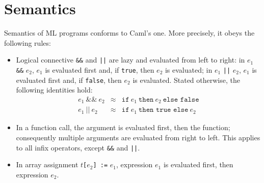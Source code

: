 \documentclass[a4paper,12pt]{report}
\newcommand{\caml}{\textsf{Caml}}
\newcommand{\te}[1]{\texttt{#1}}
\begin{document}
\section{Semantics}
\label{semantics}

Semantics of ML programs conforms to \caml's one.
More precisely, it obeys the following rules:
\begin{itemize}
\item 
  Logical connective \texttt{\&\&} and \texttt{||} are lazy and
  evaluated from left to right: in $e_1$ \texttt{\&\&} $e_2$, $e_1$ is
  evaluated first and, if \texttt{true}, then $e_2$ is evaluated; in
  $e_1$ \texttt{||} $e_2$, $e_1$ is evaluated first and, if
  \texttt{false}, then $e_2$ is evaluated.
  Stated otherwise, the following identities hold:
  \begin{displaymath}
    \begin{array}{rcl}
      e_1 ~ \te{\&\&} ~ e_2 & \approx & 
      \te{if} ~ e_1 ~ \te{then} ~ e_2 ~ \te{else false} \\[0.5em]
      e_1 ~ \te{||} ~ e_2 & \approx & 
      \te{if} ~ e_1 ~ \te{then true else} ~ e_2
    \end{array}
  \end{displaymath}
\item
  In a function call, the argument is evaluated first, then the
  function; consequently multiple arguments are evaluated from right
  to left. This applies to all infix operators, except
  \texttt{\&\&} and \texttt{||}.
\item
  In array assignment $t$\texttt{[}$e_2$\texttt{] :=} $e_1$,
  expression $e_1$ is evaluated first, then expression $e_2$.
\end{itemize}



\nocite{*}




\newpage
{}
\printindex
\end{document}
